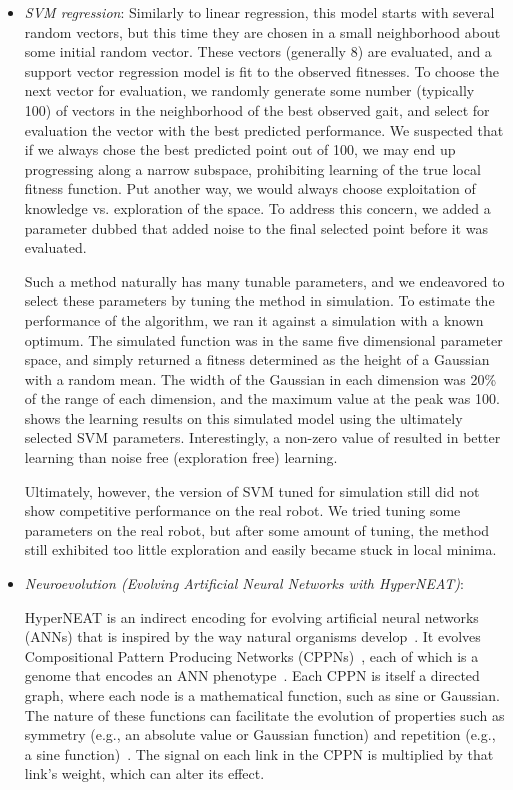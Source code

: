 \begin{itemize}
\item \emph{SVM regression}: Similarly to linear regression, this
  model starts with several random vectors, but this time they are
  chosen in a small neighborhood about some initial random vector.
  These vectors (generally 8) are evaluated, and a support vector
  regression model is fit to the observed fitnesses.  To choose the
  next vector for evaluation, we randomly generate some number
  (typically 100) of vectors in the neighborhood of the best observed
  gait, and select for evaluation the vector with the best predicted
  performance.  We suspected that if we always chose the best
  predicted point out of 100, we may end up progressing along a narrow
  subspace, prohibiting learning of the true local fitness function.
  Put another way, we would always choose exploitation of knowledge
  vs. exploration of the space.  To address this concern, we added a
  parameter dubbed  that added noise to the final
  selected point before it was evaluated.

  Such a method naturally has many tunable parameters, and we
  endeavored to select these parameters by tuning the method in
  simulation.  To estimate the performance of the algorithm, we ran it
  against a simulation with a known optimum.  The simulated function
  was in the same five dimensional parameter space, and simply
  returned a fitness determined as the height of a Gaussian with a
  random mean.  The width of the Gaussian in each dimension was 20\%
  of the range of each dimension, and the maximum value at the peak
  was 100.   shows the learning results on
  this simulated model using the ultimately selected SVM parameters.
  Interestingly, a non-zero value of  resulted in better
  learning than noise free (exploration free) learning.

  Ultimately, however, the version of SVM tuned for simulation still
  did not show competitive performance on the real robot.  We tried
  tuning some parameters on the real robot, but after some amount of
  tuning, the method still exhibited too little exploration and easily
  became stuck in local minima.

\item \emph{Neuroevolution (Evolving Artificial Neural Networks with HyperNEAT)}: 
    
  HyperNEAT is an indirect encoding for evolving artificial neural networks (ANNs) that is inspired by the way natural organisms develop~\cite{stanley2009hypercube}. It evolves Compositional Pattern Producing Networks (CPPNs)~\cite{stanley2007compositional}, each of which is a genome that encodes an ANN phenotype~\cite{stanley2009hypercube}. Each CPPN is itself a directed graph, where each node is a mathematical function, such as sine or Gaussian. The nature of these functions can facilitate the evolution of properties such as symmetry (e.g., an absolute value or Gaussian function) and repetition (e.g., a sine function)~\cite{stanley2009hypercube, stanley2007compositional}. The signal on each link in the CPPN is multiplied by that link's weight, which can alter its effect.
  

\end{itemize}
